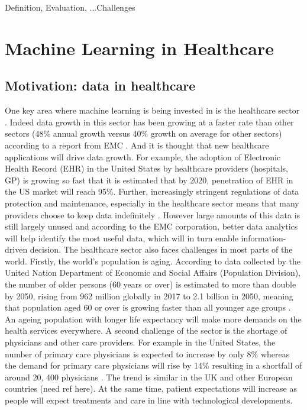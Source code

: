 Definition, Evaluation, ...Challenges

\section{Machine Learning in Healthcare}
\subsection{Motivation: data in healthcare}
One key area where machine learning is being invested in is the healthcare sector \citep{Obermeyer:2016ju,EMC:2014ve, Evans:sHGdqFvY}. Indeed data growth in this sector has been growing at a faster rate than other sectors (48\% annual growth versus 40\% growth on average for other sectors) according to a report from EMC \citep{EMC:2014ve}. And it is thought that new healthcare applications will drive data growth. For example, the adoption of Electronic Health Record (EHR) in the United States by healthcare providers (hospitals, GP) is growing so fast that it is estimated that by 2020, penetration of EHR in the US market will reach 95\%. Further, increasingly stringent regulations of data protection and maintenance, especially in the healthcare sector means that many providers choose to keep data indefinitely \citep{EMC:2014ve}.  However large amounts of this data is still largely unused and according to the EMC corporation, better data analytics will help identify the most useful data, which will in turn enable information-driven decision.
The healthcare sector also faces challenges in most parts of the world. Firstly, the world’s population is aging. According to data collected by the United Nation Department of Economic and Social Affairs (Population Division), the number of older persons (60 years or over) is estimated to more than double by 2050, rising from 962 million globally in 2017 to 2.1 billion in 2050, meaning that population aged 60 or over is growing faster than all younger age groups \citep{UnitedNations:2017wd}. An ageing population with longer life expectancy will make more demands on the health services everywhere. A second challenge of the sector is the shortage of physicians and other care providers. For example in the United States, the number of primary care physicians is expected to increase by only 8\% whereas the demand for primary care physicians will rise by 14\% resulting in a shortfall of around 20, 400 physicians \citep{EMC:2014ve}. The trend is similar in the UK and other European countries (need ref here). At the same time, patient expectations will increase as people will expect treatments and care in line with technological developments.\newline
